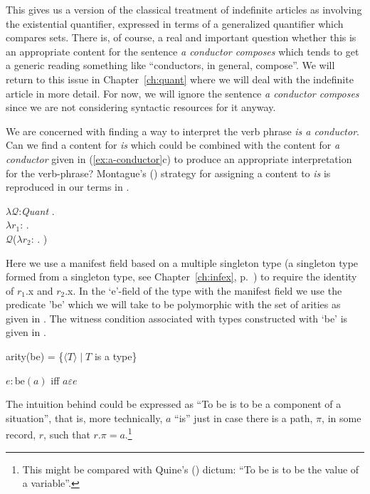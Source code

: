 This gives us a version of the classical treatment of indefinite
articles as involving the existential quantifier, expressed in terms
of a generalized quantifier which compares sets.  There is, of course,
a real and important question whether this is an appropriate content
for the sentence \textit{a conductor composes} which tends to get a
generic reading something like ``conductors, in general, compose''.
We will return to this issue in Chapter~\ref{ch:quant} where we will
deal with the indefinite article in more detail.  For now, we will
ignore the sentence \textit{a conductor composes} since we are not
considering syntactic resources for it anyway.  

We are concerned
with finding a way to interpret the verb phrase \textit{is a
  conductor}.  Can we find a content for \textit{is} which could be
combined with the content for \textit{a conductor} given in
(\ref{ex:a-conductor}c) to produce an appropriate interpretation for
the verb-phrase?  Montague's (\citeyear{Montague1973}) strategy for
assigning a content to \textit{is} is reproduced in our terms in
\nexteg{}.
\begin{ex} 
$\lambda\mathcal{Q}$:\textit{Quant} . \\
\hspace*{1em} $\lambda r_1$:
. \\
\hspace*{2em} $\mathcal{Q}$($\lambda
r_2$:
. )
\label{ex:cont-is} 
\end{ex}



Here we use a manifest field based on a multiple singleton type (a
singleton type formed from a singleton type, see
Chapter~\ref{ch:infex}, p.~\pageref{pg:multiple-singleton-types}) to require
the identity of $r_1$.x and $r_2$.x.  In the `e'-field of the type
with the manifest field we use the predicate 'be' which we will take
to be polymorphic with the set of arities  as given in .  The witness
condition associated with types constructed with `be' is given in
.
\begin{ex} 
\begin{subex} 
 
\item arity(be) = \{$\langle T\rangle\mid T$ is a type\} 
 
\item $e:\text{be}(a)$ iff $a\varepsilon e$ 
 
\end{subex} 
\label{ex:pred-be}   
\end{ex} 
The intuition behind  could be expressed as ``To be is to be
a component of a situation'', that is, more technically, $a$ ``is''
just in case there is a path, $\pi$, 
in some record, $r$, such that $r.\pi=a$.\footnote{This might be
  compared with Quine's (\citeyear{Quine1948}) dictum:  ``To be is to
  be the value of a variable''.}   
  
